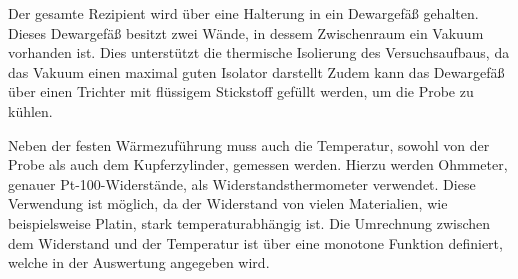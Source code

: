 Der gesamte Rezipient wird über eine Halterung in ein Dewargefäß gehalten.
Dieses Dewargefäß besitzt zwei Wände, in dessem Zwischenraum ein Vakuum vorhanden ist.
Dies unterstützt die thermische Isolierung des Versuchsaufbaus, da das Vakuum einen maximal guten Isolator darstellt %
Zudem kann das Dewargefäß über einen Trichter mit flüssigem Stickstoff gefüllt werden, um die Probe zu kühlen.

Neben der festen Wärmezuführung muss auch die Temperatur, sowohl von der Probe als auch dem Kupferzylinder, gemessen werden.
Hierzu werden Ohmmeter, genauer Pt-100-Widerstände, als Widerstandsthermometer verwendet.
Diese Verwendung ist möglich, da der Widerstand von vielen Materialien, wie beispielsweise Platin, stark temperaturabhängig ist.
Die Umrechnung zwischen dem Widerstand und der Temperatur ist über eine monotone Funktion definiert, welche in der Auswertung angegeben wird.
